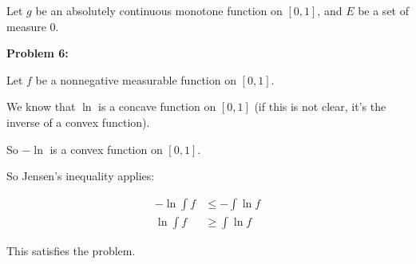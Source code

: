 \documentclass[a4paper,12pt]{article}
\newcommand{\shunt}{\vspace{20mm}}
\begin{document}
Let $g$ be an absolutely continuous monotone function on $[0,1]$, and $E$ be a set of measure $0$.


\shunt

{\bf Problem 6:} 

Let $f$ be a nonnegative measurable function on $[0,1]$.

We know that $\ln$ is a concave function on $[0,1]$ (if this is not clear, it's the inverse of a convex function).

So $-\ln$ is a convex function on $[0,1]$.

So Jensen's inequality applies:

\begin{align*}
-\ln \int f &\leq -\int\ln f \\
\ln \int f & \geq \int \ln f
\end{align*}

This satisfies the problem.

\shunt
\end{document}
